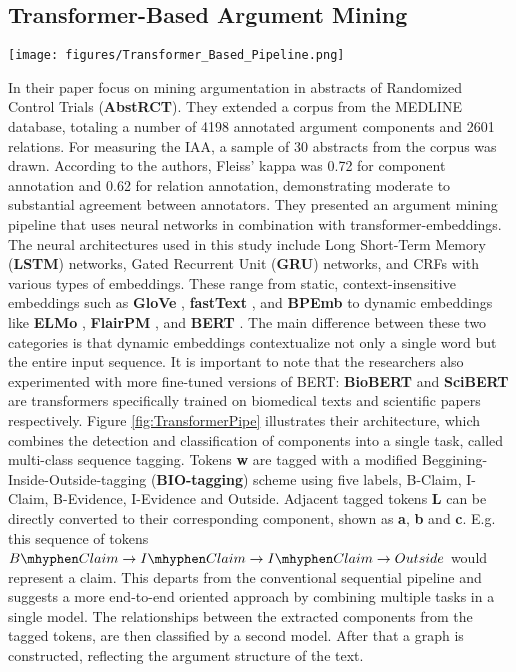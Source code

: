 \subsection{Transformer-Based Argument Mining } \label{sec:Transformer}
\begin{figure*}
    \centering
    \texttt{[image: figures/Transformer\_Based\_Pipeline.png]}
    \caption{Pipeline of clinical trial argument mining \parencite{TransformerHealthcareAM}. }
    \label{fig:TransformerPipe}
\end{figure*}
In their paper \textcite{TransformerHealthcareAM} focus on mining argumentation in abstracts of Randomized Control Trials (\textbf{AbstRCT}). They extended a corpus from the MEDLINE database, totaling a number of 4198 annotated argument components and 2601 relations. For measuring the IAA, a sample of 30 abstracts from the corpus was drawn. According to the authors, Fleiss' kappa was 0.72 for component annotation and 0.62 for relation annotation, demonstrating moderate to substantial agreement between annotators. They presented an argument mining pipeline that uses neural networks in combination with transformer-embeddings. The neural architectures used in this study include Long Short-Term Memory (\textbf{LSTM}) networks, Gated Recurrent Unit (\textbf{GRU}) networks, and CRFs with various types of embeddings. These range from static, context-insensitive embeddings such as \textbf{GloVe} \parencite{glove}, \textbf{fastText} \parencite{bojanowski2016enriching}, and \textbf{BPEmb} \parencite{bpemb} to dynamic embeddings like \textbf{ELMo} \parencite{ELMo}, \textbf{FlairPM} \parencite{flair}, and \textbf{BERT} \parencite{bert}. The main difference between these two categories is that dynamic embeddings contextualize not only a single word but the entire input sequence. It is important to note that the researchers also experimented with more fine-tuned versions of BERT: \textbf{BioBERT} \parencite{biobert} and \textbf{SciBERT} \parencite{scibert} are transformers specifically trained on biomedical texts and scientific papers respectively. Figure \ref{fig:TransformerPipe} illustrates their architecture, which combines the detection and classification of components into a single task, called multi-class sequence tagging. Tokens \textbf{w} are tagged with a modified Beggining-Inside-Outside-tagging (\textbf{BIO-tagging}) scheme using five labels, B-Claim, I-Claim, B-Evidence, I-Evidence and Outside. Adjacent tagged tokens \textbf{L} can be directly converted to their corresponding component, shown as \textbf{a}, \textbf{b} and \textbf{c}. E.g. this sequence of tokens \(B \mhyphen Claim \rightarrow I \mhyphen Claim \rightarrow I \mhyphen Claim \rightarrow Outside\) would represent a claim. This departs from the conventional sequential pipeline and suggests a more end-to-end oriented approach by combining multiple tasks in a single model. The relationships between the extracted components from the tagged tokens, are then classified by a second model. After that a graph is constructed, reflecting the argument structure of the text.

